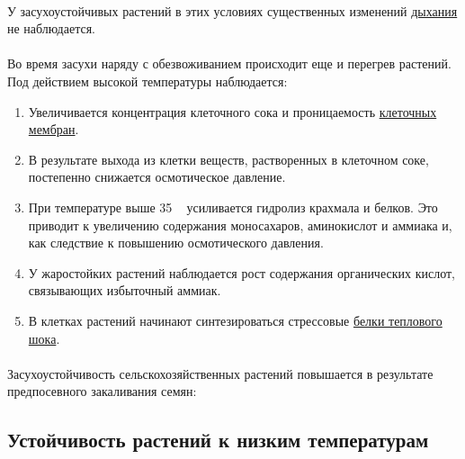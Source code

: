 \paragraph*{}У засухоустойчивых растений в этих условиях существенных изменений \hyperlink{sect_breazing}{дыхания} не наблюдается.

\paragraph*{}Во время засухи наряду с обезвоживанием происходит еще и перегрев растений. Под действием высокой температуры наблюдается:

\begin{enumerate}
	\item Увеличивается концентрация клеточного сока и проницаемость \hyperlink{plasmolema}{клеточных мембран}.  
	\item В результате выхода из клетки веществ, растворенных в клеточном соке, постепенно снижается осмотическое давление. 
	\item При температуре выше 35 \celsius~ усиливается гидролиз крахмала и белков. Это приводит к увеличению содержания моносахаров, аминокислот и аммиака и, как следствие к повышению осмотического давления.
	\item У жаростойких растений наблюдается рост содержания органических кислот, связывающих избыточный аммиак. 

	\item В клетках растений начинают синтезироваться стрессовые \hyperlink{HeatShockProteins}{белки теплового шока}. 
\end{enumerate}

\paragraph*{}Засухоустойчивость сельскохозяйственных растений повышается в результате предпосевного закаливания семян: 


\subsection*{Устойчивость растений к низким температурам}

\paragraph*{} 

